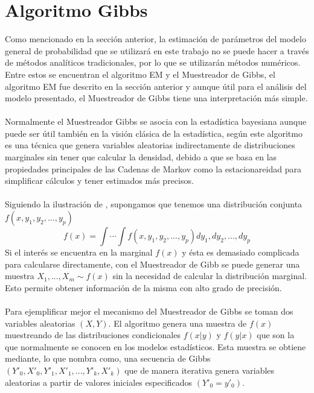 \section{Algoritmo Gibbs}
Como mencionado en la secci\'on anterior, la estimaci\'on de par\'ametros del modelo general de probabilidad que se utilizar\'a en este trabajo no se puede hacer a trav\'es de m\'etodos anal\'iticos tradicionales, por lo que se utilizar\'an m\'etodos num\'ericos. Entre estos se encuentran el algoritmo EM y el Muestreador de Gibbs, el algoritmo EM fue descrito en la secci\'on anterior y aunque \'util para el an\'alisis del modelo presentado, el Muestreador de Gibbs tiene una interpretaci\'on m\'as simple.\\
\\
Normalmente el Muestreador Gibbs se asocia con la estad\'istica bayesiana aunque puede ser \'util tambi\'en en la visi\'on cl\'asica de la estad\'istica, seg\'un \cite{casella1992explaining} este algoritmo es una t\'ecnica que genera variables aleatorias indirectamente de distribuciones marginales sin tener que calcular la densidad, debido a que se basa en las propiedades principales de las Cadenas de Markov como la estacionareidad para simplificar c\'alculos y tener estimados m\'as precisos.\\
\\
Siguiendo la ilustraci\'on de \cite{casella1992explaining}, supongamos que tenemos una distribuci\'on conjunta $f(x,y_1,y_2,...,y_p)$\\
\[f(x)=\int \cdots \int f(x,y_1,y_2,...,y_p) dy_1,dy_2,...,dy_p\]
Si el inter\'es se encuentra en la marginal $f(x)$ y \'esta es demasiado complicada para calcularse directamente, con el Muestreador de Gibb se puede generar una muestra $X_1,...,X_m \sim f(x)$ sin la necesidad de calcular la distribuci\'on marginal. Esto permite obtener informaci\'on de la misma con alto grado de precisi\'on.\\
\\
Para ejemplificar mejor el mecanismo del Muestreador de Gibbs se toman dos variables aleatorias $(X,Y)$. El algoritmo genera una muestra de $f(x)$ muestreando de las distribuciones condicionales $f(x|y)$ y $f(y|x)$ que son la que normalmente se conocen en los modelos estad\'isticos. Esta muestra se obtiene mediante, lo que \cite{casella1992explaining} nombra como, una secuencia de Gibbs $(Y'_0,X'_0,Y'_1,X'_1,...,Y'_k,X'_k)$ que de manera iterativa genera variables aleatorias a partir de valores iniciales especificados $(Y'_0=y'_0)$.\\
